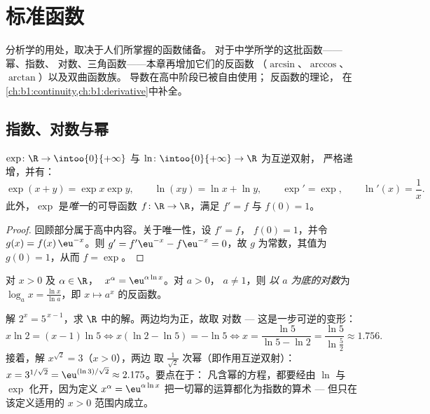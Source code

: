 \chapter{标准函数}\label{ch:b1:functions}

分析学的用处，取决于人们所掌握的函数储备。
对于中学所学的这批函数——幂、指数、
对数、三角函数——本章再增加它们的反函数
（$\arcsin$、$\arccos$、$\arctan$）以及双曲函数族。
导数在高中阶段已被自由使用；
反函数的理论，
在\cref{ch:b1:continuity,ch:b1:derivative}中补全。

\section{指数、对数与幂}

\begin{proposition}[回顾与刻画]\label{prop:b1:functions:expln}
$\exp \colon \R \to \intoo{0}{+\infty}$ 与 $\ln \colon
\intoo{0}{+\infty} \to \R$ 为互逆双射，
严格递增，并有：
\[
\exp(x + y) = \exp x \exp y, \qquad \ln(xy) = \ln x + \ln y,
\qquad \exp' = \exp, \qquad \ln'(x) = \frac 1x .
\]
此外，$\exp$ 是\emph{唯一}的可导函数 $f \colon
\R \to \R$，满足 $f' = f$ 与 $f(0) = 1$。
\end{proposition}

\begin{proof}
回顾部分属于高中内容。关于唯一性，设 $f' = f$，
$f(0) = 1$，并令 $g(x) = f(x)\,\eu^{-x}$。则 $g' = f'\eu^{-x} -
f\eu^{-x} = 0$，故 $g$ 为常数，其值为 $g(0) = 1$，从而 $f = \exp$。
\end{proof}

\begin{definition}[一般幂]\label{def:b1:functions:powers}
对 $x > 0$ 及 $\alpha \in \R$，
$\;x^\alpha = \eu^{\alpha \ln x}$。对 $a > 0$，
$a \neq 1$，则 \emph{以 $a$ 为底的对数}为 $\log_a x =
\frac{\ln x}{\ln a}$，即 $x \mapsto a^x$ 的反函数。
\end{definition}

\begin{example}[解指数方程]\label{ex:b1:functions:expequations}
解 $2^x = 5^{\,x-1}$，求 $\R$ 中的解。两边均为正，故取
对数 --- 这是一步可逆的变形：
\[
x\ln2 = (x - 1)\ln5
\iff x(\ln2 - \ln5) = -\ln5
\iff x = \frac{\ln5}{\ln5 - \ln2} = \frac{\ln 5}{\ln\frac52}
\approx 1.756 .
\]
接着，解 $x^{\sqrt2} = 3$（$x > 0$），两边
取 $\frac1{\sqrt2}$ 次幂（即作用互逆双射）：
$x = 3^{1/\sqrt2} = \eu^{(\ln 3)/\sqrt2} \approx 2.175$。要点在于：
凡含幂的方程，都要经由 $\ln$ 与
$\exp$ 化开，因为定义 $x^\alpha = \eu^{\alpha\ln x}$
把一切幂的运算都化为指数的算术 ---
但只在该定义适用的 $x > 0$ 范围内成立。
\end{example}

